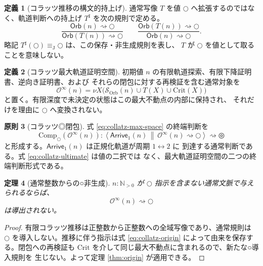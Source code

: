 \documentclass[a4paper,11pt]{ltjsarticle}
\theoremstyle{definition}
\newtheorem{definition}{定義}[section]
\newtheorem{principle}[definition]{原則}
\theoremstyle{plain}
\newtheorem{theorem}[definition]{定理}
\newcommand{\dfix}{\mathord{\text{○}}}
\newcommand{\udfix}{\mathord{\text{◎}}}
\newcommand{\N}{\mathbb{N}}
\newcommand{\Comp}{\mathrm{Comp}_{\dfix}}
\newcommand{\Crit}{\mathrm{Crit}}
\newcommand{\JTeq}{\equiv_{\mathrm{J}}}
\newcommand{\Arr}{\mathsf{Arrive}_{1}}
\newcommand{\1}{\mathbf{1}}
\begin{document}
\begin{definition}[コラッツ推移の構文的持上げ]
通常写像 $T$ を値 $\dfix$ へ拡張するのではなく、軌道判断への持上げ
$T^\sharp$ を次の規則で定める。
\begin{equation}\label{eq:collatz-origin}
 \frac{\mathsf{Orb}(n)\rightsquigarrow\dfix}
      {\mathsf{Orb}(T(n))\rightsquigarrow\dfix}
 \qquad
 \frac{\mathsf{Orb}(T(n))\rightsquigarrow\dfix}
      {\mathsf{Orb}(n)\rightsquigarrow\dfix}.
\end{equation}
略記 $T^\sharp(\dfix)\JTeq\dfix$ は、この保存・非生成規則を表し、
$T$ が $\dfix$ を値として取ることを意味しない。
\end{definition}

\begin{definition}[コラッツ最大軌道証明空間]
初期値 $n$ の有限軌道探索、有限下降証明書、逆向き証明書、および
それらの閉包に対する再検証を含む通常対象を
\begin{equation}\label{eq:collatz-max-space}
 \mathcal{O}^{\infty}(n)
 =
 \nu X\bigl(
  \mathcal{S}_{\mathrm{Orb}}(n)
  \cup T(X)
  \cup\Crit(X)
 \bigr)
\end{equation}
と置く。有限深度で未決定の状態はこの最大不動点の内部に保持され、
それだけを理由に $\dfix$ へ変換されない。
\end{definition}

\begin{principle}[コラッツ◎閉包]\label{pr:collatz-closure}
式 \eqref{eq:collatz-max-space} の終端判断を
\begin{equation}\label{eq:collatz-ultimate}
 \Comp(\mathcal{O}^{\infty}(n)):
 \left\langle
   \Arr(n)
   \ \middle\Vert\
   \mathcal{O}^{\infty}(n)\rightsquigarrow\dfix
 \right\rangle
 \rightsquigarrow\udfix
\end{equation}
と形成する。$\Arr(n)$ は正規化軌道が周期 $1\leftrightarrow2$ に
到達する通常判断である。式 \eqref{eq:collatz-ultimate} は値の二択では
なく、最大軌道証明空間の二つの終端判断形式である。
\end{principle}

\begin{theorem}[通常整数からの○非生成]\label{thm:collatz-no-create}
$n:\N_{>0}$ が $\dfix$ 指示を含まない通常文脈で与えられるならば、
\[
 \mathcal{O}^{\infty}(n)\rightsquigarrow\dfix
\]
は導出されない。
\end{theorem}

\begin{proof}
有限コラッツ推移は正整数から正整数への全域写像であり、通常規則は
$\dfix$ を導入しない。推移に伴う指示は式
\eqref{eq:collatz-origin} によって由来を保存する。閉包への再検証も
$\Crit$ を介して同じ最大不動点に含まれるので、新たな○導入規則を
生じない。よって定理 \ref{thm:origin} が適用できる。
\end{proof}
\end{document}
